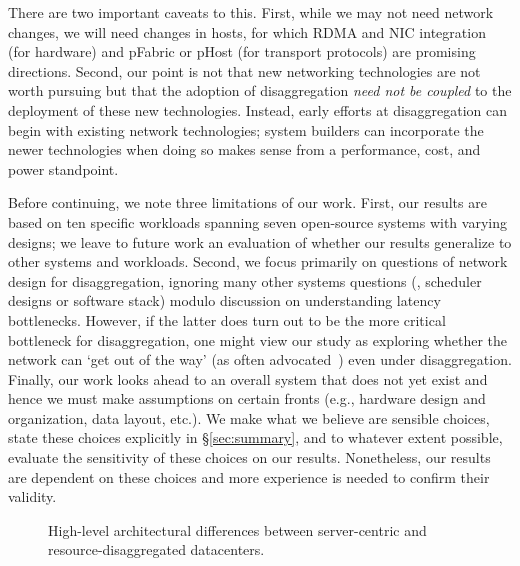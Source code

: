 There are two important caveats to this.  First, while we may not need network changes, we will need changes in hosts, for which RDMA and NIC integration (for hardware) and pFabric or pHost (for transport protocols) are promising directions. Second, our point is not that new networking technologies are not worth pursuing but that the adoption of disaggregation \emph{need not be coupled} to the deployment of these new technologies. Instead, early efforts at disaggregation can begin with existing network technologies; system builders can incorporate the newer technologies when doing so makes sense from a performance, cost, and power standpoint.

Before continuing, we note three limitations of our work. First, our results are based on ten specific workloads spanning seven open-source systems with varying designs; we leave to future work an evaluation of whether our results generalize to other systems and workloads.
Second, we focus primarily on questions of network design for disaggregation, ignoring many other systems questions (\eg, scheduler designs or software stack) modulo discussion on understanding latency bottlenecks. However, if the latter does turn out to be the more critical bottleneck for disaggregation, one might view our study as exploring whether the network can `get out of the way' (as often advocated~\cite{greenberg-sigcomm15}) even under disaggregation. Finally, our work looks ahead to an overall system that does not yet exist and hence we must make assumptions on certain fronts (e.g., hardware design and organization, data layout, etc.). We make what we believe are sensible choices, state these choices explicitly in \S\ref{sec:summary}, and to whatever extent possible, evaluate the sensitivity of these choices on our results. Nonetheless, our results are dependent on these choices and more experience is needed to confirm their validity.

\begin{figure}[!h]
\centering 
{}
{}
\caption{High-level architectural differences between server-centric and resource-disaggregated datacenters.}
\label{fig:dc}
\end{figure}